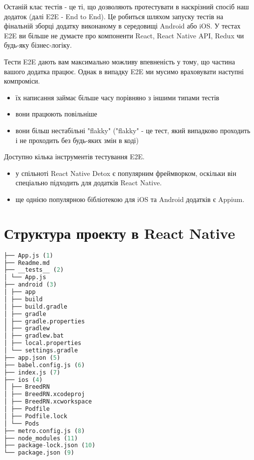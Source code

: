 Останій клас тестів - це ті, що дозволяють протестувати в наскрізний спосіб наш додаток (далі E2E - End to End).
Це робиться шляхом запуску тестів на фінальній зборці додатку виконаному в середовищі Android або iOS.
У тестах E2E ви більше не думаєте про компоненти React, React Native API, Redux чи будь-яку бізнес-логіку.

Тести E2E дають вам максимально можливу впевненість у тому, що частина вашого додатка працює.
Однак в випадку E2E ми мусимо враховувати наступні компроміси.

\begin{itemize}
    \item їх написання займає більше часу порівняно з іншими типами тестів
    \item вони працюють повільніше
    \item вони більш нестабільні "flakky" ("flakky"  - це тест, який випадково проходить і не проходить без будь-яких змін в коді)
\end{itemize}

Доступно кілька інструментів тестування E2E.
\begin{itemize}
    \item у спільноті React Native Detox є популярним фреймворком, оскільки він спеціально підходить для додатків React Native.\cite{detox_home_page}
    \item ще однією популярною бібліотекою для iOS та Android додатків є Appium.\cite{appium_home_page}
\end{itemize}

\section{Структура проекту в React Native}
\label{section.2.10}

\begin{lstlisting}[style=light, language=Python,label={lst:rn_app_structure},caption=React Native App Layout]
├── App.js (1)
├── Readme.md
├── __tests__ (2)
│ └── App.js
├── android (3)
│ ├── app
│ ├── build
│ ├── build.gradle
│ ├── gradle
│ ├── gradle.properties
│ ├── gradlew
│ ├── gradlew.bat
│ ├── local.properties
│ └── settings.gradle
├── app.json (5)
├── babel.config.js (6)
├── index.js (7)
├── ios (4)
│ ├── BreedRN
│ ├── BreedRN.xcodeproj
│ ├── BreedRN.xcworkspace
│ ├── Podfile
│ ├── Podfile.lock
│ └── Pods
├── metro.config.js (8)
├── node_modules (11)
├── package-lock.json (10)
└── package.json (9)
\end{lstlisting}

